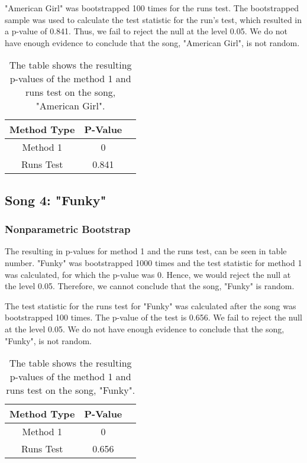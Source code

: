 \documentclass[12pt, letterpaper]{article}
\begin{document}
"American Girl" was bootstrapped 100 times for the runs test. The bootstrapped sample was used to calculate the test statistic for the run's test, which resulted in a p-value of 0.841. Thus, we fail to reject the null at the level 0.05. We do not have enough evidence to conclude that the song, "American Girl", is not random.
\begin{table}[h]
\begin{center}
\begin{tabular}{|c|c|c|}
\hline
\textbf{Method Type} & P-Value \\
\hline
Method 1 & 0  \\
\hline
Runs Test & 0.841 \\ 
\hline
\end{tabular}
\end{center}
\caption{The table shows the resulting p-values of the method 1 and runs test on the song, "American Girl".}
\label{fig: P-values for "American Girl"}
\end{table}

\subsection{Song 4: "Funky"}

\subsubsection{Nonparametric Bootstrap}
The resulting in p-values for method 1 and the runs test, can be seen in table number. "Funky" was bootstrapped 1000 times and the test statistic for method 1 was calculated, for which the p-value was 0. Hence, we would reject the null at the level 0.05. Therefore, we cannot conclude that the song, "Funky" is random. 

The test statistic for the runs test for "Funky" was calculated after the song was bootstrapped 100 times. The p-value of the test is 0.656. We fail to reject the null at the level 0.05. We do not have enough evidence to conclude that the song, "Funky", is not random.
\begin{table}[h]
\begin{center}
\begin{tabular}{|c|c|c|}
\hline
\textbf{Method Type} & P-Value \\
\hline
Method 1 & 0  \\
\hline
Runs Test & 0.656 \\ 
\hline
\end{tabular}
\end{center}
\caption{The table shows the resulting p-values of the method 1 and runs test on the song, "Funky".}
\label{fig: P-values for "Funky"}
\end{table}
\end{document}
